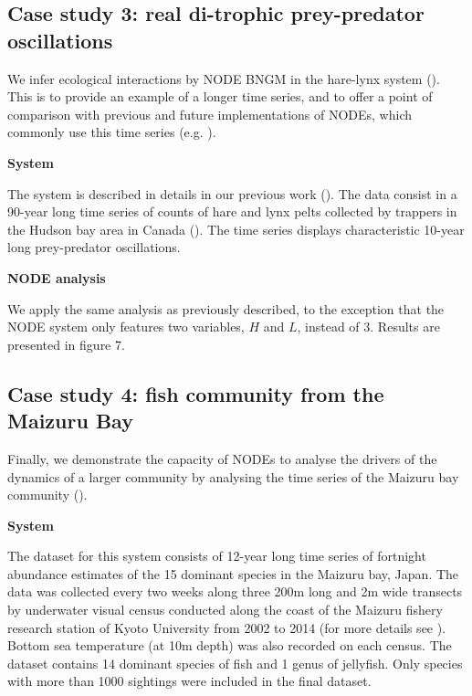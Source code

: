 \documentclass[11pt, oneside]{article}
\begin{document}
\subsection{Case study 3: real di-trophic prey-predator oscillations}

We infer ecological interactions by NODE BNGM in the hare-lynx system (\cite{Odum1972}).
This is to provide an example of a longer time series, and to offer a point of comparison with previous and future implementations of NODEs, which commonly use this time series (e.g. \cite{Bonnaffe2021a,Frank2022}).

\textbf{System}

The system is described in details in our previous work (\cite{Bonnaffe2021a}).
The data consist in a 90-year long time series of counts of hare and lynx pelts collected by trappers in the Hudson bay area in Canada (\cite{Odum1972}).
The time series displays characteristic 10-year long prey-predator oscillations.

\textbf{NODE analysis}

We apply the same analysis as previously described, to the exception that the NODE system only features two variables, $H$ and $L$, instead of 3.
Results are presented in figure 7.

\subsection{Case study 4: fish community from the Maizuru Bay}

Finally, we demonstrate the capacity of NODEs to analyse the drivers of the dynamics of a larger community by analysing the time series of the Maizuru bay community (\cite{Ushio2018}).

\textbf{System}

The dataset for this system consists of 12-year long time series of fortnight abundance estimates of the 15 dominant species in the Maizuru bay, Japan. 
The data was collected every two weeks along three 200m long and 2m wide transects by underwater visual census conducted along the coast of the Maizuru fishery research station of Kyoto University from 2002 to 2014 (for more details see \cite{Ushio2018}).
Bottom sea temperature (at 10m depth) was also recorded on each census.
The dataset contains 14 dominant species of fish and 1 genus of jellyfish.
Only species with more than 1000 sightings were included in the final dataset. 
\end{document}
